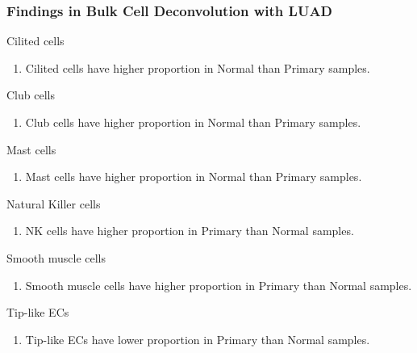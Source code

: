 \documentclass{beamer}
\begin{document}
    \begin{frame}[allowframebreaks]
        \frametitle{Findings in Bulk Cell Deconvolution with LUAD}

        \begin{block}{Cilited cells}
            \begin{enumerate}
                \item Cilited cells have higher proportion in Normal than Primary samples.
            \end{enumerate}
        \end{block}

        \begin{block}{Club cells}
            \begin{enumerate}
                \item Club cells have higher proportion in Normal than Primary samples.
            \end{enumerate}
        \end{block}

        \begin{block}{Mast cells}
            \begin{enumerate}
                \item Mast cells have higher proportion in Normal than Primary samples.
            \end{enumerate}
        \end{block}

        \begin{block}{Natural Killer cells}
            \begin{enumerate}
                \item NK cells have higher proportion in Primary than Normal samples.
            \end{enumerate}
        \end{block}

        \begin{block}{Smooth muscle cells}
            \begin{enumerate}
                \item Smooth muscle cells have higher proportion in Primary than Normal samples.
            \end{enumerate}
        \end{block}

        \begin{block}{Tip-like ECs}
            \begin{enumerate}
                \item Tip-like ECs have lower proportion in Primary than Normal samples.
            \end{enumerate}
        \end{block}
    \end{frame}
\end{document}
